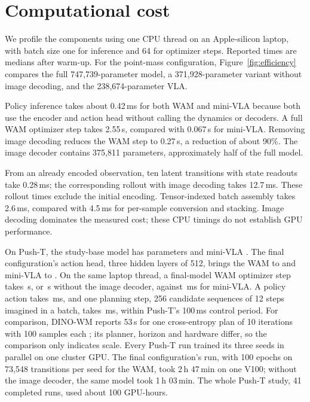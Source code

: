 \documentclass[11pt]{article}
\begin{document}
\section{Computational cost}
\label{sec:efficiency}

We profile the components using one CPU thread on an Apple-silicon laptop, with batch size one for inference and 64 for optimizer steps. Reported times are medians after warm-up. For the point-mass configuration, Figure~\ref{fig:efficiency} compares the full 747,739-parameter model, a 371,928-parameter variant without image decoding, and the 238,674-parameter VLA.

Policy inference takes about 0.42\,ms for both WAM and mini-VLA because both use the encoder and action head without calling the dynamics or decoders. A full WAM optimizer step takes 2.55\,s, compared with 0.067\,s for mini-VLA. Removing image decoding reduces the WAM step to 0.27\,s, a reduction of about 90\%. The image decoder contains 375,811 parameters, approximately half of the full model.

From an already encoded observation, ten latent transitions with state readouts take 0.28\,ms; the corresponding rollout with image decoding takes 12.7\,ms. These rollout times exclude the initial encoding. Tensor-indexed batch assembly takes 2.6\,ms, compared with 4.5\,ms for per-sample conversion and stacking. Image decoding dominates the measured cost; these CPU timings do not establish GPU performance.

On Push-T, the study-base model has \PTparamsWam{} parameters and mini-VLA \PTparamsVla. The final configuration's action head, three hidden layers of 512, brings the WAM to \PTfinalParamsWam{} and mini-VLA to \PTfinalParamsVla. On the same laptop thread, a final-model WAM optimizer step takes \PTfinalLaptopStepWam\,s, or \PTfinalLaptopStepStates\,s without the image decoder, against \PTfinalLaptopStepVla\,ms for mini-VLA. A policy action takes \PTfinalLaptopActMs\,ms, and one planning step, 256 candidate sequences of 12 steps imagined in a batch, takes \PTfinalLaptopPlanMs\,ms, within Push-T's 100\,ms control period. For comparison, DINO-WM reports 53\,s for one cross-entropy plan of 10 iterations with 100 samples each \citep{zhou2024dinowm}; its planner, horizon and hardware differ, so the comparison only indicates scale. Every Push-T run trained its three seeds in parallel on one cluster GPU. The final configuration's run, with 100 epochs on 73,548 transitions per seed for the WAM, took 2\,h 47\,min on one V100; without the image decoder, the same model took 1\,h 03\,min. The whole Push-T study, 41 completed runs, used about 100 GPU-hours.
\end{document}
